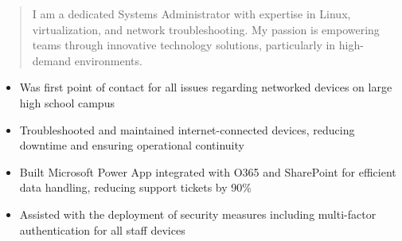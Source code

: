 



\makecvheader

\begin{quote}
  \noindent
  I am a dedicated Systems Administrator with expertise in Linux, virtualization, and network troubleshooting. My passion is empowering teams through innovative technology solutions, particularly in high-demand environments.
\end{quote}

\par\smallskip
\noindent
\begin{minipage}{20cm}
  \begin{minipage}{9.75cm}
    \begin{itemize}
      \item Was first point of contact for all issues regarding networked devices on large high school campus
      \item Troubleshooted and maintained internet-connected devices, reducing downtime and ensuring operational continuity
    \end{itemize}
  \end{minipage}
  \hfill
  \begin{minipage}{9.75cm}
    \begin{itemize}
      \item Built Microsoft Power App integrated with O365 and SharePoint for efficient data handling, reducing support tickets by 90\%
      \item Assisted with the deployment of security measures including multi-factor authentication for all staff devices
    \end{itemize}
  \end{minipage}
\end{minipage}
\par\smallskip
\divider

